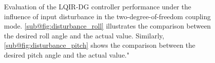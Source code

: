 \documentclass[3p,times]{elsarticle}
\begin{document}
\begin{figure}[H]
	\centering
	\hfil
	\caption{Evaluation of the LQIR-DG controller performance under the influence of input disturbance in the two-degree-of-freedom coupling mode. \ref{sub@fig:disturbance_roll} illustrates the comparison between the desired roll angle and the actual value. Similarly, \ref{sub@fig:disturbance_pitch} shows the comparison between the desired pitch angle and the actual value."}
	\label{fig:disturbance}
\end{figure}
\end{document}
